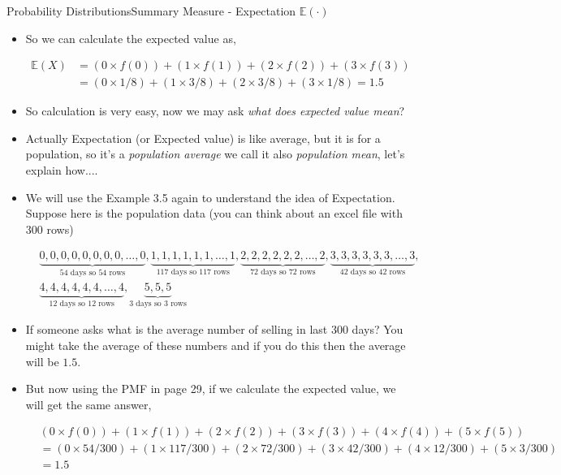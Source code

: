 \documentclass[8pt, usepdftitle=false]{beamer}
\begin{document}
\begin{frame}[allowframebreaks]{Probability Distributions}{Summary Measure - Expectation $\mathbb{E}(\cdot)$}
\begin{itemize}
\item So we can calculate the expected value as,

\begin{align*}
\mathbb{E}(X) &= \left(0 \times f(0)\right) + \left(1 \times f(1)\right) + \left(2 \times f(2)\right) + \left(3 \times f(3)\right) \\
&=\left(0 \times 1/8\right) + \left(1 \times 3/8\right) + \left(2 \times 3/8\right) + \left(3 \times 1/8\right) = 1.5
\end{align*}

\item So calculation is very easy, now we may ask \emph{what does expected value mean}?

\item Actually Expectation (or Expected value) is like average, but it is for a population, so it's a \emph{population average} we call it also \emph{population mean}, let's explain how....




\framebreak

\item We will use the Example 3.5 again to understand the idea of Expectation. Suppose here is the population data (you can think about an excel file with $300$ rows)

\begin{align*}
&\underbrace{0, 0, 0, 0, 0, 0, 0, 0, \ldots, 0}_{54 \text{ days so } 54  \text{ rows}}, \underbrace{1, 1, 1, 1, 1, 1, \ldots, 1}_{117 \text{ days so } 117 \text{ rows}}, \underbrace{2, 2, 2, 2, 2, 2, \ldots, 2}_{72 \text{ days so } 72 \text{ rows}}, \underbrace{3, 3, 3, 3, 3, 3, \ldots, 3}_{42 \text{ days so } 42 \text{ rows}}, \\
&\underbrace{4, 4, 4, 4, 4, 4, \ldots, 4}_{12 \text{ days so } 12  \text{ rows}}, \underbrace{5, 5, 5 }_{3 \text{ days so } 3 \text{ rows}}
\end{align*}

\item If someone asks what is the average number of selling in last $300$ days? You might take the average of these numbers and if you do this then the average will be $1.5$.

\item But now using the PMF in page 29, if we calculate the expected value, we will get the same answer,

\begin{align*}
 	& (0 \times f(0))+ (1 \times f(1)) + (2 \times f(2)) + (3 \times f(3)) + (4 \times f(4)) + (5 \times f(5)) \\
 	& = (0 \times 54/300) + (1 \times 117/300) + (2 \times 72/300) + (3 \times 42/300) + (4 \times 12/300) + (5 \times 3/300) \\
 	& = 1.5
 \end{align*} 


\end{itemize}
\end{frame}
\end{document}
